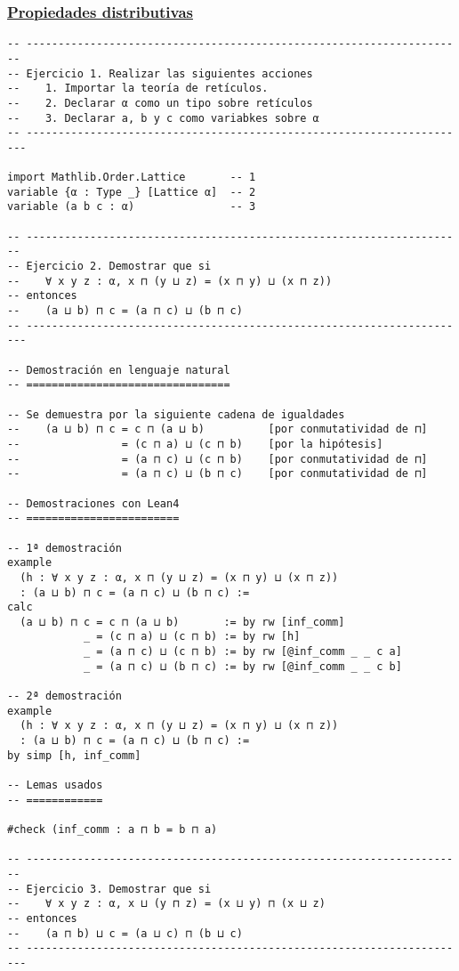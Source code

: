 \subsubsection{\href{./src/Basicos/Propiedades\_distributivas.lean}{Propiedades distributivas}}
\label{sec:org9b082d5}
\begin{verbatim}
-- ---------------------------------------------------------------------
-- Ejercicio 1. Realizar las siguientes acciones
--    1. Importar la teoría de retículos.
--    2. Declarar α como un tipo sobre retículos
--    3. Declarar a, b y c como variabkes sobre α
-- ----------------------------------------------------------------------

import Mathlib.Order.Lattice       -- 1
variable {α : Type _} [Lattice α]  -- 2
variable (a b c : α)               -- 3

-- ---------------------------------------------------------------------
-- Ejercicio 2. Demostrar que si
--    ∀ x y z : α, x ⊓ (y ⊔ z) = (x ⊓ y) ⊔ (x ⊓ z))
-- entonces
--    (a ⊔ b) ⊓ c = (a ⊓ c) ⊔ (b ⊓ c)
-- ----------------------------------------------------------------------

-- Demostración en lenguaje natural
-- ================================

-- Se demuestra por la siguiente cadena de igualdades
--    (a ⊔ b) ⊓ c = c ⊓ (a ⊔ b)          [por conmutatividad de ⊓]
--                = (c ⊓ a) ⊔ (c ⊓ b)    [por la hipótesis]
--                = (a ⊓ c) ⊔ (c ⊓ b)    [por conmutatividad de ⊓]
--                = (a ⊓ c) ⊔ (b ⊓ c)    [por conmutatividad de ⊓]

-- Demostraciones con Lean4
-- ========================

-- 1ª demostración
example
  (h : ∀ x y z : α, x ⊓ (y ⊔ z) = (x ⊓ y) ⊔ (x ⊓ z))
  : (a ⊔ b) ⊓ c = (a ⊓ c) ⊔ (b ⊓ c) :=
calc
  (a ⊔ b) ⊓ c = c ⊓ (a ⊔ b)       := by rw [inf_comm]
            _ = (c ⊓ a) ⊔ (c ⊓ b) := by rw [h]
            _ = (a ⊓ c) ⊔ (c ⊓ b) := by rw [@inf_comm _ _ c a]
            _ = (a ⊓ c) ⊔ (b ⊓ c) := by rw [@inf_comm _ _ c b]

-- 2ª demostración
example
  (h : ∀ x y z : α, x ⊓ (y ⊔ z) = (x ⊓ y) ⊔ (x ⊓ z))
  : (a ⊔ b) ⊓ c = (a ⊓ c) ⊔ (b ⊓ c) :=
by simp [h, inf_comm]

-- Lemas usados
-- ============

#check (inf_comm : a ⊓ b = b ⊓ a)

-- ---------------------------------------------------------------------
-- Ejercicio 3. Demostrar que si
--    ∀ x y z : α, x ⊔ (y ⊓ z) = (x ⊔ y) ⊓ (x ⊔ z)
-- entonces
--    (a ⊓ b) ⊔ c = (a ⊔ c) ⊓ (b ⊔ c)
-- ----------------------------------------------------------------------


\end{verbatim}
